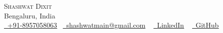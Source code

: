 \documentclass[letterpaper,11pt]{article}
\begin{document}
\begin{center}
    {\Huge \scshape Shashwat Dixit} \\ \vspace{1pt}
    Bengaluru, India \\ \vspace{1pt}
    \small 
    \href{tel:+918957058063}{\raisebox{-0.1\height}\faPhone\ \underline{+91-8957058063}}~
    \href{mailto:shashwatmain@gmail.com}{\raisebox{-0.2\height}\faEnvelope\  \underline{shashwatmain@gmail.com}} ~ 
    \href{https://linkedin.com/in/dixitshashwat/}{\raisebox{-0.2\height}\faLinkedin\ \underline{LinkedIn}}  ~
    \href{https://github.com/shashwatt-codes}{\raisebox{-0.2\height}\faGithub\ \underline{GitHub}}
    \vspace{-6pt}
\end{center}

\end{document}
